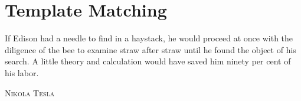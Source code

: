 \chapter{Template Matching} 
\label{chap:TemplateMatching}

\epigraph{If Edison had a needle to find in a haystack, he would proceed at once with the diligence of the bee to examine straw after straw until he found the object of his search. 
\linebreak \linebreak
A little theory and calculation would have saved him ninety per cent of his labor.}
{\textsc{Nikola Tesla}}

\pagebreak







